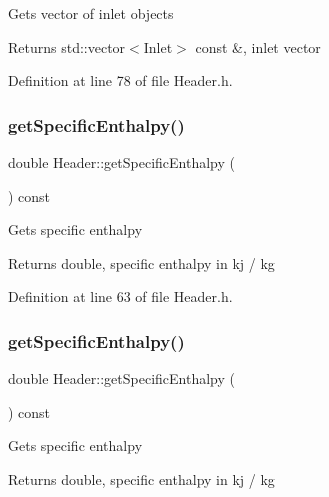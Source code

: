 Gets vector of inlet objects \begin{DoxyReturn}{Returns}
std\+::vector$<$\+Inlet$>$ const \&, inlet vector 
\end{DoxyReturn}


Definition at line 78 of file Header.\+h.

\mbox{\label{class_header_af913dbf132f8cb3af6e6b374813acd93}} 
\subsubsection{\texorpdfstring{get\+Specific\+Enthalpy()}{getSpecificEnthalpy()}\hspace{0.1cm}{\footnotesize\ttfamily [1/3]}}
{\footnotesize\ttfamily double Header\+::get\+Specific\+Enthalpy (\begin{DoxyParamCaption}{ }\end{DoxyParamCaption}) const\hspace{0.3cm}{\ttfamily [inline]}}

Gets specific enthalpy \begin{DoxyReturn}{Returns}
double, specific enthalpy in kj / kg 
\end{DoxyReturn}


Definition at line 63 of file Header.\+h.

\mbox{\label{class_header_af913dbf132f8cb3af6e6b374813acd93}} 
\subsubsection{\texorpdfstring{get\+Specific\+Enthalpy()}{getSpecificEnthalpy()}\hspace{0.1cm}{\footnotesize\ttfamily [2/3]}}
{\footnotesize\ttfamily double Header\+::get\+Specific\+Enthalpy (\begin{DoxyParamCaption}{ }\end{DoxyParamCaption}) const\hspace{0.3cm}{\ttfamily [inline]}}

Gets specific enthalpy \begin{DoxyReturn}{Returns}
double, specific enthalpy in kj / kg 
\end{DoxyReturn}



